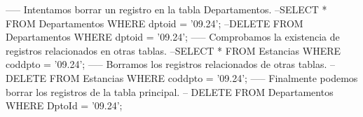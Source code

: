 \lstset{caption=Ejemplo de DELETE,label=sql:delete}
\begin{SQL}
----- Intentamos borrar un registro en la tabla Departamentos.
--SELECT * FROM Departamentos WHERE dptoid = '09.24';
--DELETE FROM Departamentos WHERE dptoid = '09.24';
----- Comprobamos la existencia de registros relacionados en otras tablas.
--SELECT * FROM Estancias WHERE coddpto = '09.24';
----- Borramos los registros relacionados de otras tablas.
-- DELETE FROM Estancias WHERE coddpto = '09.24';
----- Finalmente podemos borrar los registros de la tabla principal.
-- DELETE FROM Departamentos WHERE DptoId = '09.24';
\end{SQL}